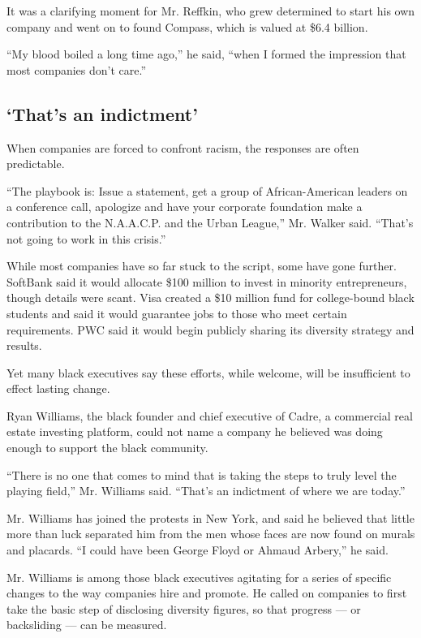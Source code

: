 It was a clarifying moment for Mr. Reffkin, who grew determined to start
his own company and went on to found Compass, which is valued at \$6.4
billion.

``My blood boiled a long time ago,'' he said, ``when I formed the
impression that most companies don't care.''

\hypertarget{thats-an-indictment}{%
\subsection{`That's an indictment'}\label{thats-an-indictment}}

When companies are forced to confront racism, the responses are often
predictable.

``The playbook is: Issue a statement, get a group of African-American
leaders on a conference call, apologize and have your corporate
foundation make a contribution to the N.A.A.C.P. and the Urban League,''
Mr. Walker said. ``That's not going to work in this crisis.''

While most companies have so far stuck to the script, some have gone
further. SoftBank said it would allocate \$100 million to invest in
minority entrepreneurs, though details were scant. Visa created a \$10
million fund for college-bound black students and said it would
guarantee jobs to those who meet certain requirements. PWC said it would
begin publicly sharing its diversity strategy and results.

Yet many black executives say these efforts, while welcome, will be
insufficient to effect lasting change.

Ryan Williams, the black founder and chief executive of Cadre, a
commercial real estate investing platform, could not name a company he
believed was doing enough to support the black community.

``There is no one that comes to mind that is taking the steps to truly
level the playing field,'' Mr. Williams said. ``That's an indictment of
where we are today.''

Mr. Williams has joined the protests in New York, and said he believed
that little more than luck separated him from the men whose faces are
now found on murals and placards. ``I could have been George Floyd or
Ahmaud Arbery,'' he said.

Mr. Williams is among those black executives agitating for a series of
specific changes to the way companies hire and promote. He called on
companies to first take the basic step of disclosing diversity figures,
so that progress --- or backsliding --- can be measured.

